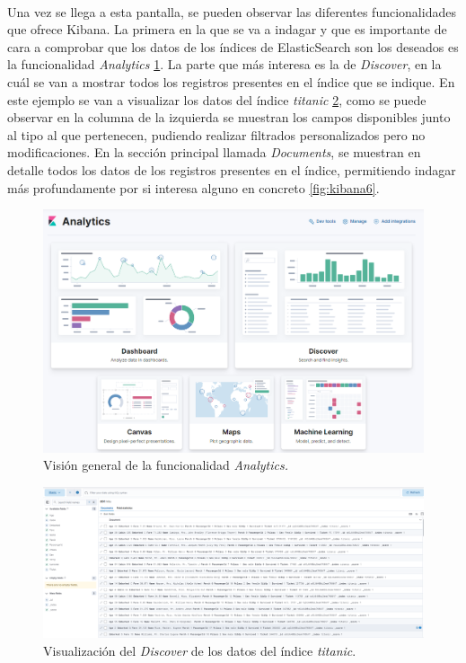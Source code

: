 \paragraph{}
\paragraph{}


Una vez se llega a esta pantalla, se pueden observar las diferentes funcionalidades que ofrece Kibana. La primera en la que se va a indagar y que es importante de cara a comprobar que los datos de los índices de ElasticSearch son los deseados es la funcionalidad \textit{Analytics} \ref{fig:kibana3}. La parte que más interesa es la de \textit{Discover}, en la cuál se van a mostrar todos los registros presentes en el índice que se indique. En este ejemplo se van a visualizar los datos del índice \textit{titanic} \ref{fig:kibana4}, como se puede observar en la columna de la izquierda se muestran los campos disponibles junto al tipo al que pertenecen, pudiendo realizar filtrados personalizados pero no modificaciones. En la sección principal llamada \textit{Documents}, se muestran en detalle todos los datos de los registros presentes en el índice, permitiendo indagar más profundamente por si interesa alguno en concreto \ref{fig:kibana6}.

\begin{figure}
    \centering
    \includegraphics[width=1\linewidth]{img/kibana3.png}
    \caption{Visión general de la funcionalidad \textit{Analytics.}}
    \label{fig:kibana3}
\end{figure}

\begin{figure}
    \centering
    \includegraphics[width=1\linewidth]{img/kibana4.png}
    \caption{Visualización del \textit{Discover} de los datos del índice \textit{titanic}.}
    \label{fig:kibana4}
\end{figure}


